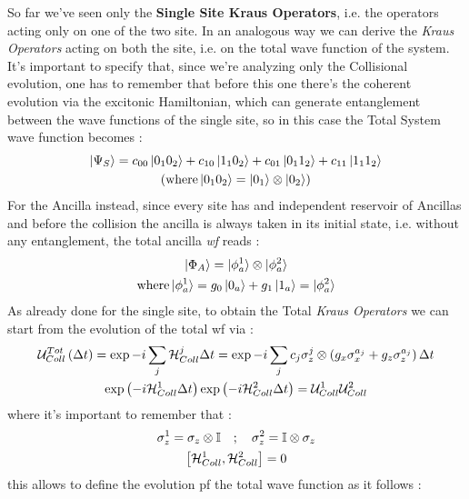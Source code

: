 \documentclass[a4paper,12pt]{article}
\begin{document}
\newpage 
So far we've seen only the \textbf{Single Site Kraus Operators}, i.e. the operators acting only on one of the two site. In an analogous way we can derive the \textit{Kraus Operators} acting on both the site, i.e. on the total wave function of the system. It's important to specify that, since we're analyzing only the Collisional evolution, one has to remember that before this one there's the coherent evolution via the excitonic Hamiltonian, which can generate entanglement between the wave functions of the single site, so in this case the Total System wave function becomes :
\begin{gather}
	\ket{\Psi_{S}} = c_{00} \ket{0_{1}0_{2}} + c_{10} \ket{1_{1}0_{2}} + c_{01} \ket{0_{1}1_{2}} + c_{11} \ket{1_{1}1_{2}} \\
	\left(\text{where}  \ket{0_{1}0_{2}} = \ket{0_{1}} \otimes \ket{0_{2}}\right) \notag
\end{gather}
For the Ancilla instead, since every site has and independent reservoir of Ancillas and before the collision the ancilla is always taken in its initial state, i.e. without any entanglement, the total ancilla \textit{wf} reads :
\begin{gather}
	\ket{\Phi_{A}} = \ket{\phi_{a}^{1}} \otimes \ket{\phi_{a}^{2}} \\
	\text{where} \ket{\phi_{a}^{1}} = g_{0} \ket{0_{a}} + g_{1} \ket{1_{a}} =  \ket{\phi_{a}^{2}} \notag
\end{gather}
As already done for the single site, to obtain the Total \textit{Kraus Operators} we can start from the evolution of the total wf via :
\begin{gather}
	\mathcal{U}_{Coll}^{Tot} \left(\Delta t\right) = \exp{ -i \sum_{j}{\mathcal{H}_{Coll}^{j}} \Delta t } = \exp{-i \sum_{j}{c_{j} \sigma_{z}^{j} \otimes \left( g_{x} \sigma_{x}^{a_{j}} + g_{z} \sigma_{z}^{a_{j}} \right) \Delta t}} \notag \\
	\exp{ \left(-i \mathcal{H}_{Coll}^{1} \Delta t\right) } \exp{ \left(-i \mathcal{H}_{Coll}^{2} \Delta t\right) } = \mathcal{U}_{Coll}^{1} \mathcal{U}_{Coll}^{2}
\end{gather}
where it's important to remember that :
\begin{gather}
	\sigma_{z}^{1} = \sigma_{z} \otimes \mathbb{I} \quad ; \quad 	\sigma_{z}^{2} = \mathbb{I} \otimes \sigma_{z} \notag \\
	\left[ \mathcal{H}_{Coll}^{1}, \mathcal{H}_{Coll}^{2} \right] = 0
\end{gather}
this allows to define the evolution pf the total wave function as it follows : 
\end{document}

